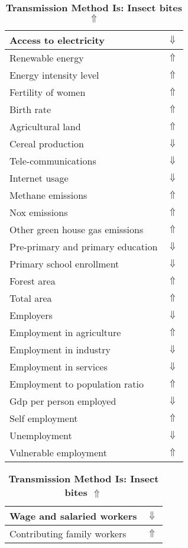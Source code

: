 \documentclass[12pt,notitlepage,oneside]{report}
\begin{document}
\begin{table}[!htb]
\caption{\textbf{Transmission Method Is: Insect bites $\Uparrow$}}
\centering
\label{Correlated Socio-economic Factors0}
\begin{tabular}{|l|l|}
\hline
Access to electricity & $\Downarrow$\\ \hline
Renewable energy & $\Uparrow$\\ \hline
Energy intensity level & $\Uparrow$\\ \hline
Fertility of women & $\Uparrow$\\ \hline
Birth rate & $\Uparrow$\\ \hline
Agricultural land & $\Uparrow$\\ \hline
Cereal production & $\Downarrow$\\ \hline
Tele-communications & $\Downarrow$\\ \hline
Internet usage & $\Downarrow$\\ \hline
Methane emissions & $\Uparrow$\\ \hline
Nox emissions & $\Uparrow$\\ \hline
Other green house gas emissions & $\Uparrow$\\ \hline
Pre-primary and primary education & $\Downarrow$\\ \hline
Primary school enrollment & $\Downarrow$\\ \hline
Forest area & $\Uparrow$\\ \hline
Total area & $\Uparrow$\\ \hline
Employers & $\Downarrow$\\ \hline
Employment in agriculture & $\Uparrow$\\ \hline
Employment in industry & $\Downarrow$\\ \hline
Employment in services & $\Downarrow$\\ \hline
Employment to population ratio & $\Uparrow$\\ \hline
Gdp per person employed & $\Downarrow$\\ \hline
Self employment & $\Uparrow$\\ \hline
Unemployment & $\Downarrow$\\ \hline
Vulnerable employment & $\Uparrow$\\ \hline
\end{tabular}
\begin{tabular}{|l|l|}
\hline
Wage and salaried workers & $\Downarrow$\\ \hline
Contributing family workers & $\Uparrow$\\ \hline

\end{tabular}
\end{table}
\end{document}
